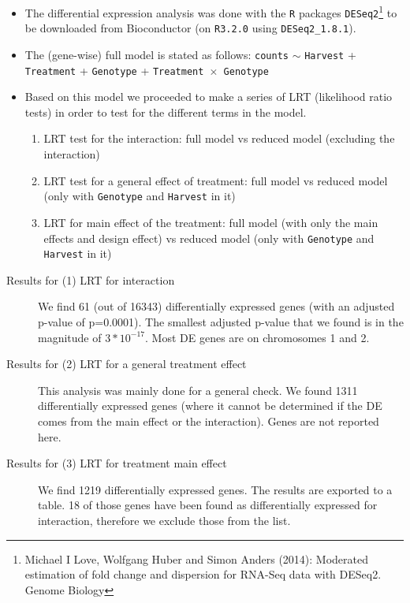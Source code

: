 \documentclass[12pt, a4paper]{article}
\begin{document}
\begin{itemize}

\item The differential expression analysis was done with the \texttt{R} packages \texttt{DESeq2}\footnote{Michael I Love, Wolfgang Huber and Simon Anders (2014): Moderated estimation of fold change and dispersion 
for RNA-Seq  data with DESeq2. Genome Biology} 
to be downloaded from Bioconductor (on \texttt{R3.2.0} using \texttt{DESeq2\_1.8.1}). 

\item The (gene-wise) full model is stated as follows: 
\newline \texttt{counts} $\sim$ \texttt{Harvest} + \texttt{Treatment} + \texttt{Genotype} + \texttt{Treatment $\times$ Genotype}

\item Based on this model we proceeded to make a series of LRT (likelihood ratio tests) in order to test for 
the different terms in the model.
	\begin{enumerate}
	\item LRT test for the interaction: full model vs reduced model (excluding the interaction)
	\item LRT test for a general effect of treatment: full model vs reduced model (only with \texttt{Genotype} and \texttt{Harvest} in it)
	\item LRT for main effect of the treatment: full model (with only the main effects and design effect) vs reduced model (only with \texttt{Genotype} and \texttt{Harvest} in it)
	\end{enumerate}

\end{itemize}

\begin{description}
\item[Results for (1) LRT for interaction]
	We find 61 (out of 16343) differentially expressed genes (with an adjusted p-value of p=0.0001). The smallest 
	adjusted p-value that we found is in the magnitude of $3*10^{-17}$.  Most DE genes are on chromosomes 1 and 2.
\item[Results for (2) LRT for a general treatment effect] 
	This analysis was mainly done for a general check. We found 1311 differentially expressed genes (where it 
	cannot be determined if the DE comes from the main effect or the interaction). Genes are not reported here.
\item[Results for (3) LRT for treatment main effect] 
	We find 1219 differentially expressed genes. The results are exported to a table. 18 of those genes have been 
	found as differentially expressed for interaction, therefore we exclude those from the list.	
\end{description}
\end{document}
